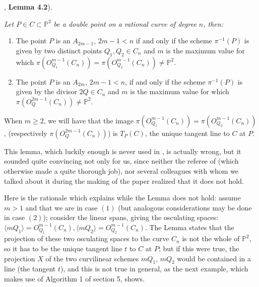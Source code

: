 \documentclass[draft]{amsart}
\theoremstyle{definition}
\theoremstyle{remark}
\theoremstyle{definition}
\newcommand{\PP}{\mathbb{P}}
\def\a{\bigskip \par \noindent}
\begin{document}
\a {\rm (}\cite{BGI}, {\bf Lemma 4.2}{\rm )}.   {\it Let $P\in C\subset \PP^2$ be a double point on a rational curve of degree $n$, then:
 \begin{enumerate}
\item \label{nodo}The point $P$ is an $A_{2m-1}$, $2m-1<n$ if and only if the scheme $\pi^{-1}(P)$ is given by two distinct points $Q_1,Q_2\in C_n$  and $m$ is the maximum value for which  $\pi(O^{m-1}_{Q_1}(C_n))=\pi(O^{m-1}_{Q_2}(C_n))\neq \PP^2$.

\item\label{cuspfacile} The point  $P$ is an $A_{2m}$, $2m-1 < n$, if and only if the scheme $\pi^{-1}(P)$ is given by the divisor  $2Q\in C_n$  and $m$ is the maximum value for which  $\pi(O^{2m-1}_{Q}(C_n))\neq \PP^2$.
\end{enumerate}
\noindent When $m\geq 2$, we will have that the image $\pi(O^{m-1}_{Q_1}(C_n))=\pi(O^{m-1}_{Q_2}(C_n))$, (respectively $\pi(O^{2m-1}_{Q}(C_n))$) is $T_P(C)$, the unique tangent line to $C$ at $P$.}


\a This lemma, which luckily enough is never used in \cite{BGI}, is actually wrong, but it sounded quite convincing not only for us, since neither the referee of \cite{BGI} (which otherwise made a quite thorough job), nor several colleagues with whom we talked about it during the making of the paper realized that it does not hold.  


\a Here is the rationale which explains while the Lemma does not hold: assume $m>1$ and that we are in case $(1)$ (but analogous considerations may be done in case $(2)$); consider the linear spans, giving the osculating spaces: $\langle mQ_1  \rangle = O^{m-1}_{Q_1}(C_n), \langle mQ_2  \rangle  = O^{m-1}_{Q_2}(C_n)$. The Lemma states that the projection of these two osculating spaces to the curve $C_n$ is not the whole of $\mathbb{P}^2$, so it has to be the unique tangent line $t$ to $C$ at $P$; but if this were true, the projection $X$ of the two curvilinear schemes $mQ_1$, $mQ_2$ would  be contained in a line (the tangent $t$), and this is not true in general, as the next example, which makes use of Algorithm 1 of section 5, shows.
\end{document}
